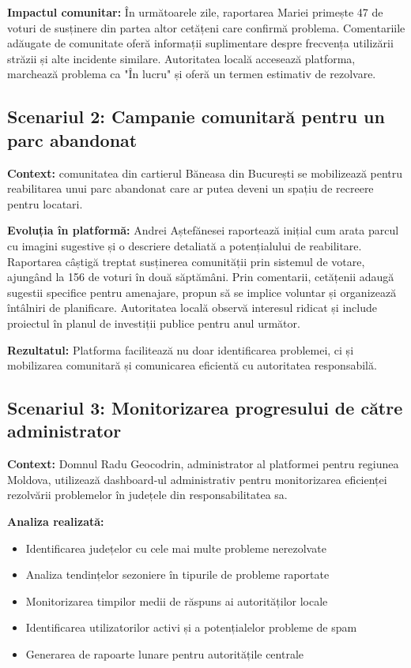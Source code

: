 \documentclass[12pt,a4paper]{report}
\begin{document}
\textbf{Impactul comunitar:} În următoarele zile, raportarea Mariei primește 47 de voturi de susținere din partea altor cetățeni care confirmă problema. Comentariile adăugate de comunitate oferă informații suplimentare despre frecvența utilizării străzii și alte incidente similare. Autoritatea locală accesează platforma, marchează problema ca "În lucru" și oferă un termen estimativ de rezolvare.


\subsection{Scenariul 2: Campanie comunitară pentru un parc abandonat}

\textbf{Context:} comunitatea din cartierul Băneasa din București se mobilizează pentru reabilitarea unui parc abandonat care ar putea deveni un spațiu de recreere pentru locatari.

\textbf{Evoluția în platformă:}
Andrei Aștefănesei raportează inițial cum arata  parcul cu imagini sugestive și o descriere detaliată a potențialului de reabilitare. Raportarea câștigă treptat susținerea comunității prin sistemul de votare, ajungând la 156 de voturi în două săptămâni. Prin comentarii, cetățenii adaugă sugestii specifice pentru amenajare, propun să se implice voluntar și organizează întâlniri de planificare. Autoritatea locală observă interesul ridicat și include proiectul în planul de investiții publice pentru anul următor.

\textbf{Rezultatul:} Platforma facilitează nu doar identificarea problemei, ci și mobilizarea comunitară și comunicarea eficientă cu autoritatea responsabilă.

\subsection{Scenariul 3: Monitorizarea progresului de către administrator}

\textbf{Context:} Domnul Radu Geocodrin, administrator al platformei pentru regiunea Moldova, utilizează dashboard-ul administrativ pentru monitorizarea eficienței rezolvării problemelor în județele din responsabilitatea sa.

\textbf{Analiza realizată:}
\begin{itemize}
\item Identificarea județelor cu cele mai multe probleme nerezolvate
\item Analiza tendințelor sezoniere în tipurile de probleme raportate
\item Monitorizarea timpilor medii de răspuns ai autorităților locale
\item Identificarea utilizatorilor activi și a potențialelor probleme de spam
\item Generarea de rapoarte lunare pentru autoritățile centrale
\end{itemize}
\end{document}
